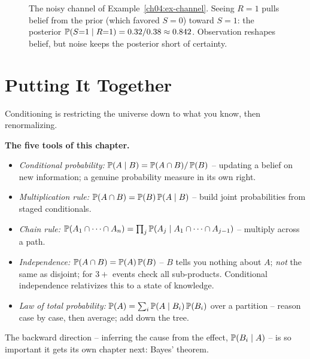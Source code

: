 \begin{figure}[H]
\centering
{}
\caption{The noisy channel of Example~\ref{ch04:ex-channel}. Seeing $R{=}1$ pulls belief from the prior (which favored $S{=}0$) toward $S{=}1$: the posterior $\P(S{=}1\given R{=}1) = 0.32/0.38 \approx 0.842$. Observation reshapes belief, but noise keeps the posterior short of certainty.}
\label{ch04:fig-channel}
\end{figure}

\section{Putting It Together}
\label{ch04:summary}

Conditioning is restricting the universe down to what you know, then renormalizing.

\begin{focusbox}
\textbf{The five tools of this chapter.}
\begin{itemize}
\item \emph{Conditional probability:} $\P(A\given B) = \P(A\cap B)/\P(B)$ -- updating a belief on new information; a genuine probability measure in its own right.
\item \emph{Multiplication rule:} $\P(A\cap B) = \P(B)\P(A\given B)$ -- build joint probabilities from staged conditionals.
\item \emph{Chain rule:} $\P(A_1\cap\cdots\cap A_n) = \prod_j \P(A_j \given A_1\cap\cdots\cap A_{j-1})$ -- multiply across a path.
\item \emph{Independence:} $\P(A\cap B) = \P(A)\P(B)$ -- $B$ tells you nothing about $A$; \emph{not} the same as disjoint; for $3+$ events check all sub-products. Conditional independence relativizes this to a state of knowledge.
\item \emph{Law of total probability:} $\P(A) = \sum_i \P(A\given B_i)\P(B_i)$ over a partition -- reason case by case, then average; add down the tree.
\end{itemize}
The backward direction -- inferring the cause from the effect, $\P(B_i \given A)$ -- is so important it gets its own chapter next: Bayes' theorem.
\end{focusbox}

